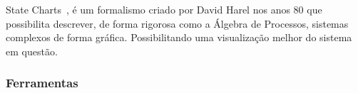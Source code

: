 State Charts~\cite{Harel:1987:SVF:34884.34886},
é um formalismo criado por David Harel nos anos 80
que possibilita descrever, de forma rigorosa como a
Álgebra de Processos, sistemas complexos de forma gráfica.
Possibilitando uma visualização melhor do sistema em questão.

\subsubsection{Ferramentas}
\paragraph{}
